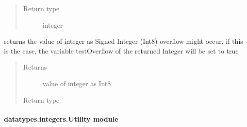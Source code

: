 \documentclass[letterpaper,10pt,english]{sphinxmanual}
\begin{document}
\begin{fulllineitems}
\begin{fulllineitems}
\begin{quote}
\begin{description}
\item[{Return type}] \leavevmode
integer

\end{description}\end{quote}

\end{fulllineitems}


\begin{fulllineitems}
\label{datatypes.integers:datatypes.integers.UInt8.UInt8.toInt8}
returns the value of integer as Signed Integer (Int8)
overflow might occur, if this is the case, the variable testOverflow of the returned Integer will be set to true
\begin{quote}\begin{description}
\item[{Returns}] \leavevmode
value of integer as Int8

\item[{Return type}] \leavevmode
{\hyperref[datatypes.integers:datatypes.integers.Int8.Int8]{}}

\end{description}\end{quote}

\end{fulllineitems}


\end{fulllineitems}



\paragraph{datatypes.integers.Utility module}
\label{datatypes.integers:module-datatypes.integers.Utility}\label{datatypes.integers:datatypes-integers-utility-module}
\end{document}
